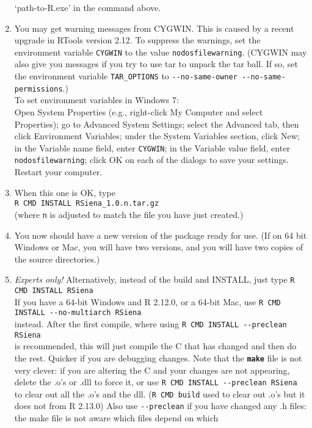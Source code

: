 \documentclass[12pt, a4paper]{article}
\renewcommand{\=}{\,=\,}
\newcommand{\+}{\,+\,}
\newcommand{\sfn}[1]{\textbf{\texttt{#1}}}
\begin{document}
\begin{enumerate}
  `path-to-R.exe' in the command above.
\item You may get warning messages from CYGWIN. This is caused by a recent
  upgrade in RTools version 2.12. To suppress the warnings, set the environment
  variable \verb|CYGWIN| to the value \verb|nodosfilewarning|. (CYGWIN may also
  give you messages if you try to use tar to unpack the tar ball. If so,
  set the environment variable \verb|TAR_OPTIONS| to
\verb|--no-same-owner --no-same-permissions|.)\\
  To set environment variables in Windows 7:\\
  Open System Properties (e.g., right-click My Computer and select Properties);
   go to Advanced System Settings;
    select the Advanced tab, then click Environment Variables;
    under the System Variables section, click New;
    in the Variable name field, enter \verb|CYGWIN|;
    in the Variable value field, enter \verb|nodosfilewarning|;
    click OK on each of the dialogs to save your settings.
    Restart your computer.
\item When this one is OK, type\\
\verb|R CMD INSTALL RSiena_1.0.n.tar.gz|\\
(where \verb|n| is adjusted to match the file you have just created.)
\item You now should have a new version of the package ready for use. (If on 64
  bit Windows or Mac, you will have two versions, and you will have two copies
  of the source directories.)
\item \emph{Experts only!} Alternatively, instead of the build and INSTALL, just
  type
  \verb|R CMD INSTALL RSiena|\\
  If you have a 64-bit Windows and R 2.12.0, or a 64-bit Mac, use
  \verb|R CMD INSTALL --no-multiarch RSiena|\\
  instead. After the first compile, where using
  \verb|R CMD INSTALL --preclean RSiena| \\is recommended, this will just
  compile the C that has changed and then do the rest.  Quicker if you are
  debugging changes. Note that the \sfn{make} file is not very clever: if you
  are altering the C and your changes are not appearing, delete the .o's or .dll
  to force it, or use
  \verb|R CMD INSTALL --preclean RSiena|\\
  to clear out all the .o's and the dll. (\verb|R CMD build| used to clear out
  .o's but it does not from R 2.13.0) Also use \verb|--preclean| if you have
  changed any .h files: the make file is not aware which files depend on which

\end{enumerate}
\end{document}

